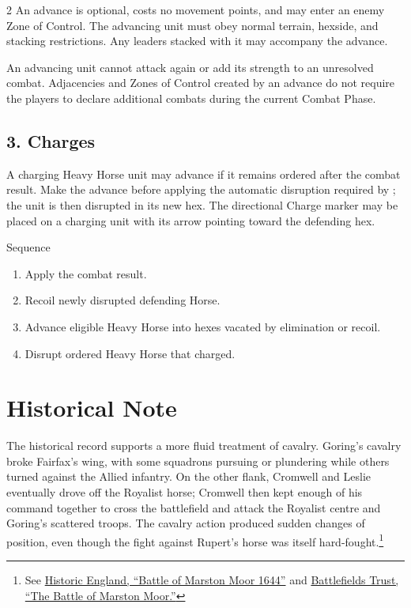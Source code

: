 \begin{multicols}{2}
An advance is optional, costs no movement points, and may enter an enemy Zone
of Control. The advancing unit must obey normal terrain, hexside, and stacking
restrictions. Any leaders stacked with it may accompany the advance.

An advancing unit cannot attack again or add its strength to an unresolved
combat. Adjacencies and Zones of Control created by an advance do not require
the players to declare additional combats during the current Combat Phase.

\subsection{3. Charges}

A charging Heavy Horse unit may advance if it remains ordered after the combat
result. Make the advance before applying the automatic disruption required by
; the unit is then disrupted in its new hex. The directional
Charge marker may be placed on a charging unit with its arrow pointing toward
the defending hex.

\begin{rulebox}{Sequence}
\begin{enumerate}[leftmargin=1.3em,itemsep=.12em,topsep=.1em]
  \item Apply the combat result.
  \item Recoil newly disrupted defending Horse.
  \item Advance eligible Heavy Horse into hexes vacated by elimination or
        recoil.
  \item Disrupt ordered Heavy Horse that charged.
\end{enumerate}
\end{rulebox}

\section{Historical Note}

The historical record supports a more fluid treatment of cavalry. Goring's
cavalry broke Fairfax's wing, with some squadrons pursuing or plundering while
others turned against the Allied infantry. On the other flank, Cromwell and
Leslie eventually drove off the Royalist horse; Cromwell then kept enough of his
command together to cross the battlefield and attack the Royalist centre and
Goring's scattered troops. The cavalry action produced sudden changes of
position, even though the fight against Rupert's horse was itself
hard-fought.\footnote{See
\href{https://historicengland.org.uk/listing/the-list/list-entry/1000020?section=official-list-entry}{Historic England, ``Battle of Marston Moor 1644''}
and
\href{https://www.battlefieldstrust.com/resource-centre/battlepageview.asp?pageid=698}{Battlefields Trust, ``The Battle of Marston Moor.''}}


\end{multicols}
